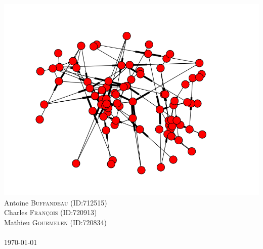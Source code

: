 \documentclass[12pt]{article}
\begin{document}
\begin{titlepage}
\includegraphics[scale=0.5]{network_stock_page_de_garde.png}\\
Antoine \textsc{Buffandeau} (ID:712515)\\
Charles \textsc{François} (ID:720913)\\
Mathieu \textsc{Gourmelen} (ID:720834)\\
 \textsc{}
\\[1cm]
{\large \today} %
\vfill
\end{titlepage}
\tableofcontents
\hypertarget{sec:part1}{}
\end{document}
